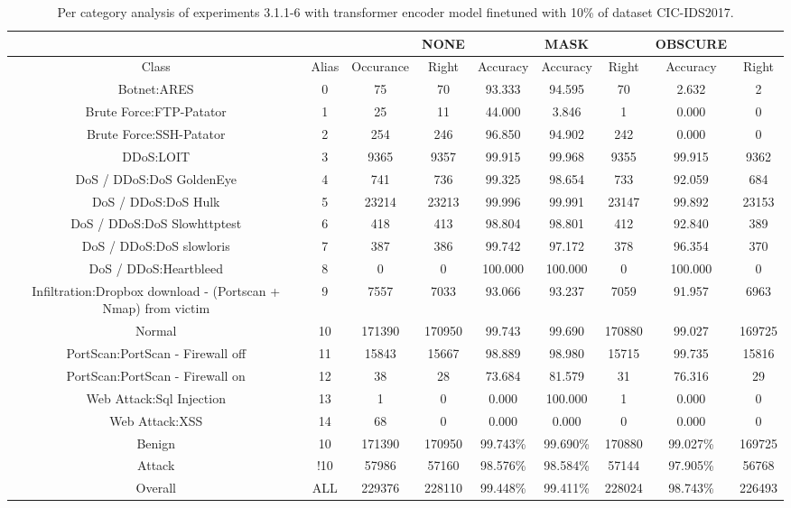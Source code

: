\begin{table}[htb]
    \centering
    \begin{tabular}{@{}ccccccccc@{}}
        \toprule
         &  &  & NONE &  & MASK &  & OBSCURE &  \\
        \midrule
        Class &  Alias &  Occurance &  Right &  Accuracy &  Accuracy &  Right &  Accuracy &  Right \\
        Botnet:ARES &  0 &  75 &  70 &  93.333 &  94.595 &  70 &  2.632 &  2 \\
        Brute Force:FTP-Patator &  1 &  25 &  11 &  44.000 &  3.846 &  1 &  0.000 &  0 \\
        Brute Force:SSH-Patator &  2 &  254 &  246 &  96.850 &  94.902 &  242 &  0.000 &  0 \\
        DDoS:LOIT &  3 &  9365 &  9357 &  99.915 &  99.968 &  9355 &  99.915 &  9362 \\
        DoS / DDoS:DoS GoldenEye &  4 &  741 &  736 &  99.325 &  98.654 &  733 &  92.059 &  684 \\
        DoS / DDoS:DoS Hulk &  5 &  23214 &  23213 &  99.996 &  99.991 &  23147 &  99.892 &  23153 \\
        DoS / DDoS:DoS Slowhttptest &  6 &  418 &  413 &  98.804 &  98.801 &  412 &  92.840 &  389 \\
        DoS / DDoS:DoS slowloris &  7 &  387 &  386 &  99.742 &  97.172 &  378 &  96.354 &  370 \\
        DoS / DDoS:Heartbleed &  8 &  0 &  0 &  100.000 &  100.000 &  0 &  100.000 &  0 \\
        Infiltration:Dropbox download - (Portscan + Nmap) from victim &  9 &  7557 &  7033 &  93.066 &  93.237 &  7059 &  91.957 &  6963 \\
        Normal &  10 &  171390 &  170950 &  99.743 &  99.690 &  170880 &  99.027 &  169725 \\
        PortScan:PortScan - Firewall off &  11 &  15843 &  15667 &  98.889 &  98.980 &  15715 &  99.735 &  15816 \\
        PortScan:PortScan - Firewall on &  12 &  38 &  28 &  73.684 &  81.579 &  31 &  76.316 &  29 \\
        Web Attack:Sql Injection &  13 &  1 &  0 &  0.000 &  100.000 &  1 &  0.000 &  0 \\
        Web Attack:XSS &  14 &  68 &  0 &  0.000 &  0.000 &  0 &  0.000 &  0 \\
        Benign &  10 &  171390 &  170950 &  99.743\% &  99.690\% &  170880 &  99.027\% &  169725 \\
        Attack &  !10 &  57986 &  57160 &  98.576\% &  98.584\% &  57144 &  97.905\% &  56768 \\
        Overall &  ALL &  229376 &  228110 &  99.448\% &  99.411\% &  228024 &  98.743\% &  226493 \\
        \bottomrule
    \end{tabular}
    \caption{Per category analysis of experiments 3.1.1-6 with transformer encoder model finetuned with 10\% of dataset CIC-IDS2017.}
    \label{table:results:lstm:class_flows10}
\end{table}